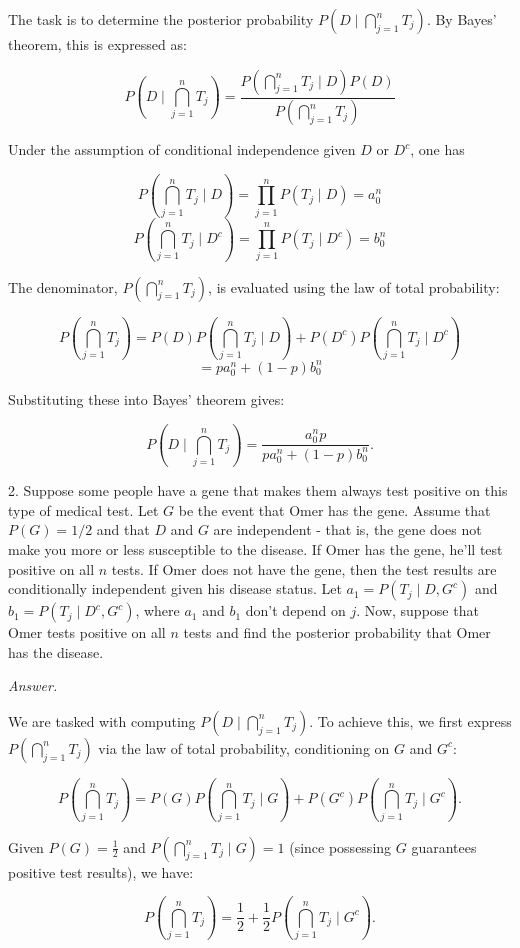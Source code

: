 \documentclass[12pt]{article}
\begin{document}
The task is to determine the posterior probability \( P(D \mid \bigcap_{j=1}^n T_j) \). By Bayes' theorem, this is expressed as:

\[ P(D \mid \bigcap_{j=1}^n T_j) = \frac{P(\bigcap_{j=1}^n T_j \mid D) P(D)}{P(\bigcap_{j=1}^n T_j)} \]

Under the assumption of conditional independence given \( D \) or \( D^c \), one has 

\[ P(\bigcap_{j=1}^n T_j \mid D) = \prod_{j=1}^n P(T_j \mid D) = a_0^n \]
\[ P(\bigcap_{j=1}^n T_j \mid D^c) = \prod_{j=1}^n P(T_j \mid D^c) = b_0^n \]

The denominator, \( P(\bigcap_{j=1}^n T_j) \), is evaluated using the law of total probability:

\[ P(\bigcap_{j=1}^n T_j) = P(D)P(\bigcap_{j=1}^n T_j \mid D) + P(D^c)P(\bigcap_{j=1}^n T_j \mid D^c) \]
\[ = pa_0^n + (1-p)b_0^n \]

Substituting these into Bayes' theorem gives:

\[ P(D \mid \bigcap_{j=1}^n T_j) = \frac{a_0^n p}{pa_0^n + (1-p)b_0^n}. \]

\begin{q}
2. Suppose some people have a gene that makes them always test positive on this type of medical test. Let \(G\) be the event that Omer has the gene. Assume that \(P(G)=1 / 2\) and that \(D\) and \(G\) are independent - that is, the gene does not make you more or less susceptible to the disease. If Omer has the gene, he'll test positive on all \(n\) tests. If Omer does not have the gene, then the test results are conditionally independent given his disease status. Let \(a_1=P\left(T_j \mid D, G^c\right)\) and \(b_1=P\left(T_j \mid D^c, G^c\right)\), where \(a_1\) and \(b_1\) don't depend on \(j\). Now, suppose that Omer tests positive on all \(n\) tests and find the posterior probability that Omer has the disease.
\end{q}
\textit{Answer.}

We are tasked with computing \(P(D \mid \bigcap_{j=1}^n T_j)\). To achieve this, we first express \(P(\bigcap_{j=1}^n T_j)\) via the law of total probability, conditioning on \(G\) and \(G^c\):

\[ P(\bigcap_{j=1}^n T_j) = P(G)P(\bigcap_{j=1}^n T_j \mid G) + P(G^c)P(\bigcap_{j=1}^n T_j \mid G^c). \]

Given \(P(G) = \frac{1}{2}\) and \(P(\bigcap_{j=1}^n T_j \mid G) = 1\) (since possessing \(G\) guarantees positive test results), we have:

\[ P(\bigcap_{j=1}^n T_j) = \frac{1}{2} + \frac{1}{2}P(\bigcap_{j=1}^n T_j \mid G^c). \]
\end{document}
